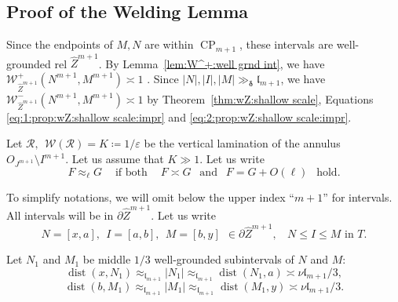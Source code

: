 \documentclass{amsart}
\renewcommand{\sp}{{\ \ }}
\newcommand{\1}{{\mathbb 1 }}
\newcommand{\Width}{{\mathcal W}}
\newcommand\RR{\mathcal{R}}
\newcommand{\wZ}{{\widehat Z}}
\newcommand{\length}{{\mathfrak l}}
\theoremstyle{remark}
\numberwithin{equation}{section}
\theoremstyle{definition}
\newcommand{\dist}{\operatorname{dist}}
\newcommand{\CP}{{\operatorname{CP}}}
\newcommand{\bdelta}{{\boldsymbol{ \delta}}}
\begin{document}
\subsection{Proof of the Welding Lemma} Since the endpoints of $M,N$ are within $\CP_{m+1}$, these intervals are well-grounded rel $\wZ^{m+1}$. By Lemma~\ref{lem:W^+:well grnd int}, we have $\Width^+_{\wZ^{m+1}}(N^{m+1},M^{m+1})\asymp 1$ . Since $|N|, |I|, |M|\gg_\bdelta \length_{m+1}$, we have $\Width^-_{\wZ^{m+1}}(N^{m+1},M^{m+1})\asymp 1$ by Theorem~\ref{thm:wZ:shallow scale}, Equations \eqref{eq:1:prop:wZ:shallow scale:impr} and \eqref{eq:2:prop:wZ:shallow scale:impr}. 



Let $\RR, \sp\Width(\RR)=K\coloneqq 1/\varepsilon$ be the vertical lamination of the annulus ${O_{J^{m+1}}\setminus I^{m+1}}$. Let us assume that $K\gg 1$. Let us write \[F\approx _\ell G\sp\sp\text{ if both }\sp\sp F\asymp G \sp\text{ and } \sp F=G+O(\ell) \sp\text{ hold.}\]


To simplify notations, we will omit below the upper index ``$m+1$'' for intervals. All intervals will be in $\partial \wZ^{m+1}$. Let us write
\[N=[x,a],\sp I=[a,b],\sp M=[b,y] \sp \in \partial \wZ^{m+1},\sp\sp N\le I\le M \text{ in }T.\]





Let $N_1$ and $M_1$ be middle $1/3$ well-grounded subintervals of $N$ and $M$:  
\[ \dist (x,N_1) \approx_{\length_{m+1}} |N_1|\approx_{\length_{m+1}}\dist ( N_1 ,a)\asymp \nu\length_{m+1}/3,\]
\[ \dist (b,M_1) \approx_{\length_{m+1}} |M_1|\approx_{\length_{m+1}}\dist (M_1,y)\asymp \nu\length_{m+1}/3.\]





\end{document}
